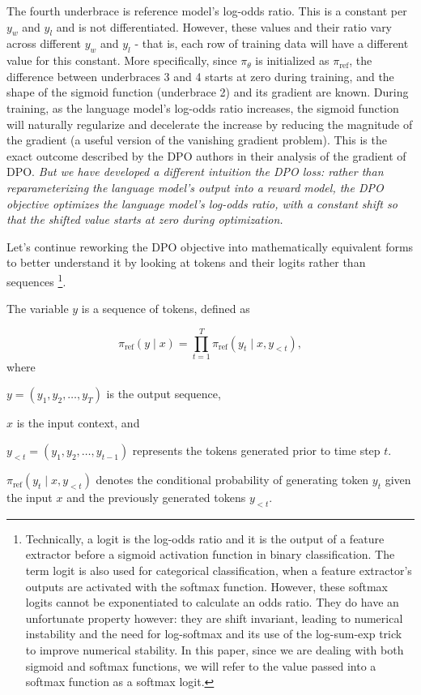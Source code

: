 \documentclass[twoside,11pt]{article}
\begin{document}
The fourth underbrace is reference model's log-odds ratio. This
is a constant per $y_w$ and $y_l$ and is not differentiated. However,
these values and their ratio vary across different $y_w$ and $y_l$ - that is,
each row of training data will have a different value for this constant. 
More specifically, since $\pi_\theta$ is initialized as $\pi_\mathrm{ref}$, 
the difference between underbraces 3 and 4 starts at zero during training, 
and the shape of the sigmoid function (underbrace 2) and its gradient are
known. During training, as the language model's log-odds ratio increases,
the sigmoid function will naturally regularize and decelerate
the increase by reducing the magnitude of the gradient (a 
useful version of the vanishing gradient problem). 
This is the exact outcome described by the DPO authors 
in their analysis of the gradient of DPO. \emph{But we have developed a different
intuition the DPO loss: rather than reparameterizing the language model's
output into a reward model, the DPO objective optimizes the 
language model's log-odds ratio, with a constant shift so that the 
shifted value starts at zero during optimization.}

Let's continue reworking the DPO objective into mathematically
equivalent forms to better understand it by looking at tokens and their logits rather
than sequences \footnote{
  Technically, a logit is the log-odds ratio and it is the output of a 
  feature extractor before a sigmoid activation function in binary
  classification. The term logit is also used for categorical classification,
  when a feature extractor's outputs are 
  activated with the softmax function. However,
  these softmax logits cannot be exponentiated to calculate an odds ratio. 
  They do have an unfortunate property
  however: they are shift invariant, leading to numerical instability and
  the need for log-softmax and its use of the log-sum-exp trick to improve
  numerical stability. In this paper, since we are dealing
  with both sigmoid and softmax functions, we will refer to the value
  passed into a softmax function as a softmax logit.
}. 

The variable $y$ is a sequence of tokens, defined as

\begin{equation}
  \label{eq:joint}
  \pi_\mathrm{ref}(y \mid x) = \prod_{t=1}^T \pi_\mathrm{ref}(y_t \mid x, y_{<t}),
\end{equation}
where 
\begin{description}
\item \(y = (y_1, y_2, \ldots, y_T)\) is the output sequence,
\item \(x\) is the input context, and
\item \(y_{<t} = (y_1, y_2, \ldots, y_{t-1})\) represents the tokens 
  generated prior to time step \(t\). 
\item 
\(\pi_\mathrm{ref}(y_t \mid x, y_{<t})\) denotes the conditional 
probability of generating token \(y_t\) given the input \(x\) and 
the previously generated tokens \(y_{<t}\).
\end{description}
\end{document}
